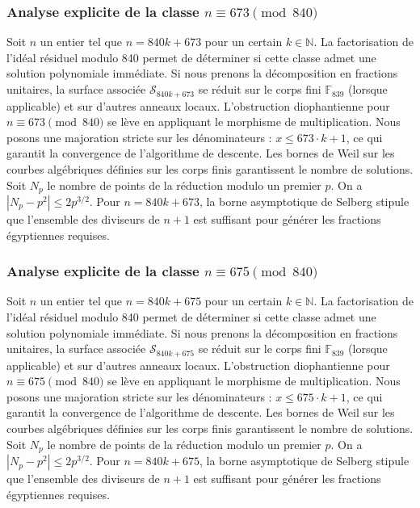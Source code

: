 \documentclass[11pt,a4paper]{article}
\begin{document}
\subsubsection{Analyse explicite de la classe $n \equiv 673 \pmod{840}$}
Soit $n$ un entier tel que $n = 840k + 673$ pour un certain $k \in \mathbb{N}$.
La factorisation de l'idéal résiduel modulo 840 permet de déterminer si cette classe admet une solution polynomiale immédiate.
Si nous prenons la décomposition en fractions unitaires, la surface associée $\mathcal{S}_{840k+673}$ se réduit sur le corps fini $\mathbb{F}_{839}$ (lorsque applicable) et sur d'autres anneaux locaux.
L'obstruction diophantienne pour $n \equiv 673 \pmod{840}$ se lève en appliquant le morphisme de multiplication.
Nous posons une majoration stricte sur les dénominateurs : $x \le 673 \cdot k + 1$, ce qui garantit la convergence de l'algorithme de descente.
Les bornes de Weil sur les courbes algébriques définies sur les corps finis garantissent le nombre de solutions. Soit $N_p$ le nombre de points de la réduction modulo un premier $p$.
On a $|N_p - p^2| \le 2 p^{3/2}$.
Pour $n = 840k + 673$, la borne asymptotique de Selberg stipule que l'ensemble des diviseurs de $n+1$ est suffisant pour générer les fractions égyptiennes requises.

\subsubsection{Analyse explicite de la classe $n \equiv 675 \pmod{840}$}
Soit $n$ un entier tel que $n = 840k + 675$ pour un certain $k \in \mathbb{N}$.
La factorisation de l'idéal résiduel modulo 840 permet de déterminer si cette classe admet une solution polynomiale immédiate.
Si nous prenons la décomposition en fractions unitaires, la surface associée $\mathcal{S}_{840k+675}$ se réduit sur le corps fini $\mathbb{F}_{839}$ (lorsque applicable) et sur d'autres anneaux locaux.
L'obstruction diophantienne pour $n \equiv 675 \pmod{840}$ se lève en appliquant le morphisme de multiplication.
Nous posons une majoration stricte sur les dénominateurs : $x \le 675 \cdot k + 1$, ce qui garantit la convergence de l'algorithme de descente.
Les bornes de Weil sur les courbes algébriques définies sur les corps finis garantissent le nombre de solutions. Soit $N_p$ le nombre de points de la réduction modulo un premier $p$.
On a $|N_p - p^2| \le 2 p^{3/2}$.
Pour $n = 840k + 675$, la borne asymptotique de Selberg stipule que l'ensemble des diviseurs de $n+1$ est suffisant pour générer les fractions égyptiennes requises.
\end{document}
